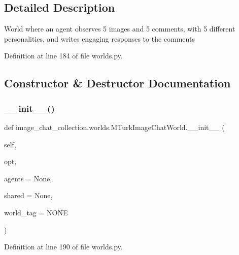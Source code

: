\subsection{Detailed Description}
\begin{DoxyVerb}World where an agent observes 5 images and 5 comments,
   with 5 different personalities,
   and writes engaging responses to the comments
\end{DoxyVerb}
 

Definition at line 184 of file worlds.\+py.



\subsection{Constructor \& Destructor Documentation}
\mbox{\label{classimage__chat__collection_1_1worlds_1_1MTurkImageChatWorld_aa4c8a2169f71ac876be070a1c9c5cbdc}} 
\subsubsection{\texorpdfstring{\+\_\+\+\_\+init\+\_\+\+\_\+()}{\_\_init\_\_()}}
{\footnotesize\ttfamily def image\+\_\+chat\+\_\+collection.\+worlds.\+M\+Turk\+Image\+Chat\+World.\+\_\+\+\_\+init\+\_\+\+\_\+ (\begin{DoxyParamCaption}\item[{}]{self,  }\item[{}]{opt,  }\item[{}]{agents = {\ttfamily None},  }\item[{}]{shared = {\ttfamily None},  }\item[{}]{world\+\_\+tag = {\ttfamily \textquotesingle{}NONE\textquotesingle{}} }\end{DoxyParamCaption})}



Definition at line 190 of file worlds.\+py.



